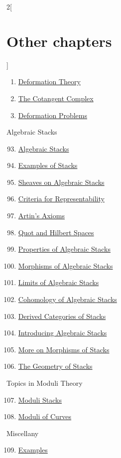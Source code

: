 \begin{multicols}{2}[\section{Other chapters}]
\begin{enumerate}
\item \hyperref[defos-section-phantom]{Deformation Theory}
\item \hyperref[cotangent-section-phantom]{The Cotangent Complex}
\item \hyperref[examples-defos-section-phantom]{Deformation Problems}
\end{enumerate}
Algebraic Stacks
\begin{enumerate}
\setcounter{enumi}{92}
\item \hyperref[algebraic-section-phantom]{Algebraic Stacks}
\item \hyperref[examples-stacks-section-phantom]{Examples of Stacks}
\item \hyperref[stacks-sheaves-section-phantom]{Sheaves on Algebraic Stacks}
\item \hyperref[criteria-section-phantom]{Criteria for Representability}
\item \hyperref[artin-section-phantom]{Artin's Axioms}
\item \hyperref[quot-section-phantom]{Quot and Hilbert Spaces}
\item \hyperref[stacks-properties-section-phantom]{Properties of Algebraic Stacks}
\item \hyperref[stacks-morphisms-section-phantom]{Morphisms of Algebraic Stacks}
\item \hyperref[stacks-limits-section-phantom]{Limits of Algebraic Stacks}
\item \hyperref[stacks-cohomology-section-phantom]{Cohomology of Algebraic Stacks}
\item \hyperref[stacks-perfect-section-phantom]{Derived Categories of Stacks}
\item \hyperref[stacks-introduction-section-phantom]{Introducing Algebraic Stacks}
\item \hyperref[stacks-more-morphisms-section-phantom]{More on Morphisms of Stacks}
\item \hyperref[stacks-geometry-section-phantom]{The Geometry of Stacks}
\end{enumerate}
Topics in Moduli Theory
\begin{enumerate}
\setcounter{enumi}{106}
\item \hyperref[moduli-section-phantom]{Moduli Stacks}
\item \hyperref[moduli-curves-section-phantom]{Moduli of Curves}
\end{enumerate}
Miscellany
\begin{enumerate}
\setcounter{enumi}{108}
\item \hyperref[examples-section-phantom]{Examples}

\end{enumerate}
\end{multicols}
